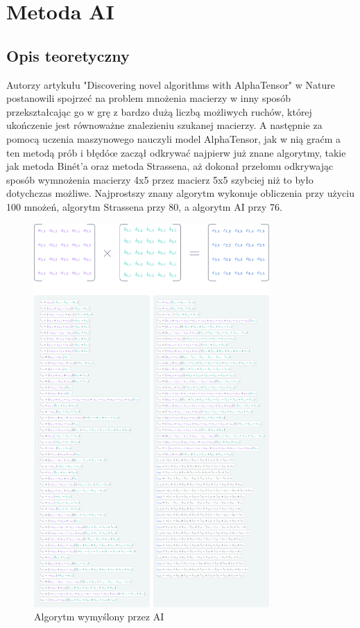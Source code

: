 \documentclass{article}
\begin{document}
\section{Metoda AI}

\subsection{Opis teoretyczny}

Autorzy artykułu "Discovering novel algorithms with AlphaTensor" w Nature postanowili spojrzeć na problem mnożenia macierzy w inny sposób przekształcając go w grę z bardzo dużą liczbą możliwych ruchów, której ukończenie jest równoważne znalezieniu szukanej macierzy. A następnie za pomocą uczenia maszynowego nauczyli model AlphaTensor, jak w nią graćm a ten metodą prób i błędóœ zaczął odkrywać najpierw już znane algorytmy, takie jak metoda Binét’a oraz metoda Strassena, aż dokonał przełomu odkrywając sposób wymnożenia macierzy 4x5 przez macierz 5x5 szybciej niż to było dotychczas możliwe. Najprostszy znany algorytm wykonuje obliczenia przy użyciu 100 mnożeń, algorytm Strassena przy 80, a algorytm AI przy 76.

\begin{figure}[H]
  \centering
    \includegraphics[width=0.8\textwidth]{AI.png}
  \caption{Algorytm wymyślony przez AI}
\end{figure}
\end{document}
